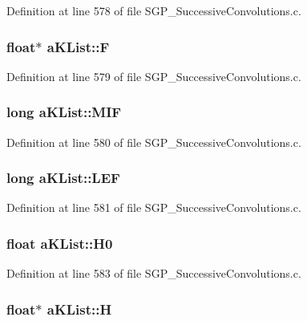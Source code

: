 Definition at line 578 of file SGP\_\-SuccessiveConvolutions.c.\hypertarget{structaKList_e21d5c02650e5f334bfffcfeb3953787}{
\subsubsection[F]{\setlength{\rightskip}{0pt plus 5cm}float$\ast$ {\bf aKList::F}}}
\label{d8/d05/structaKList_e21d5c02650e5f334bfffcfeb3953787}




Definition at line 579 of file SGP\_\-SuccessiveConvolutions.c.\hypertarget{structaKList_72100920c4eaab09e10bc54a76beedda}{
\subsubsection[MIF]{\setlength{\rightskip}{0pt plus 5cm}long {\bf aKList::MIF}}}
\label{d8/d05/structaKList_72100920c4eaab09e10bc54a76beedda}




Definition at line 580 of file SGP\_\-SuccessiveConvolutions.c.\hypertarget{structaKList_f92bb240bfdac1f2b3ada7dff4b27fbc}{
\subsubsection[LEF]{\setlength{\rightskip}{0pt plus 5cm}long {\bf aKList::LEF}}}
\label{d8/d05/structaKList_f92bb240bfdac1f2b3ada7dff4b27fbc}




Definition at line 581 of file SGP\_\-SuccessiveConvolutions.c.\hypertarget{structaKList_dc0b1b5c7136426a4feb42f607f9cfeb}{
\subsubsection[H0]{\setlength{\rightskip}{0pt plus 5cm}float {\bf aKList::H0}}}
\label{d8/d05/structaKList_dc0b1b5c7136426a4feb42f607f9cfeb}




Definition at line 583 of file SGP\_\-SuccessiveConvolutions.c.\hypertarget{structaKList_11cebe5c93f3b1cce63336144828896b}{
\subsubsection[H]{\setlength{\rightskip}{0pt plus 5cm}float$\ast$ {\bf aKList::H}}}
\label{d8/d05/structaKList_11cebe5c93f3b1cce63336144828896b}





